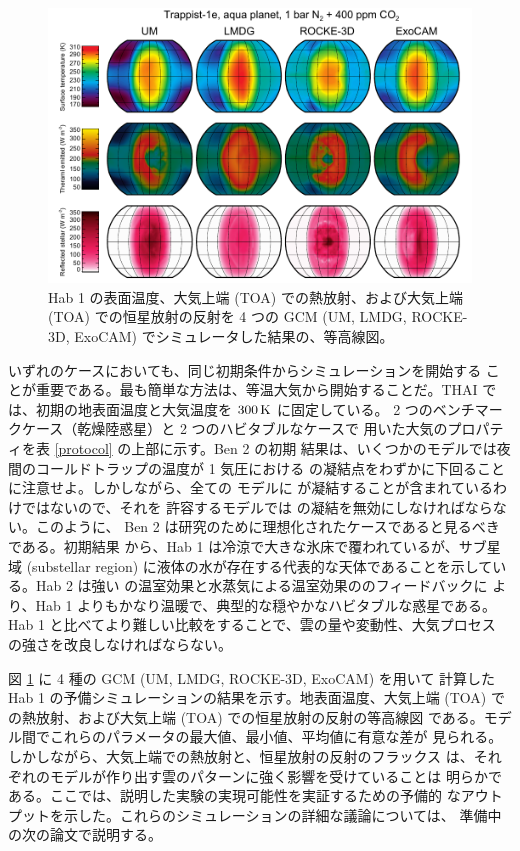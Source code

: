 \documentclass{dennou777}
\begin{document}
\begin{figure}[t]\label{contours}
	\centering
	\includegraphics[width=.8\textwidth]{gmd-13-707-2020-f01-high-res.pdf}
	\caption{
		Hab 1 の表面温度、大気上端 (TOA) での熱放射、および大気上端
		(TOA) での恒星放射の反射を 4 つの GCM (UM, LMDG, ROCKE-3D,
		ExoCAM) でシミュレータした結果の、等高線図。
	}
\end{figure}

いずれのケースにおいても、同じ初期条件からシミュレーションを開始する
ことが重要である。最も簡単な方法は、等温大気から開始することだ。THAI
では、初期の地表面温度と大気温度を \(300\hmu{K}\) に固定している。
2 つのベンチマークケース（乾燥陸惑星）と 2 つのハビタブルなケースで
用いた大気のプロパティを表 \ref{protocol} の上部に示す。Ben 2 の初期
結果は、いくつかのモデルでは夜間のコールドトラップの温度が 1 気圧における
 の凝結点をわずかに下回ることに注意せよ。しかしながら、全ての
モデルに  が凝結することが含まれているわけではないので、それを
許容するモデルでは  の凝結を無効にしなければならない。このように、
Ben 2 は研究のために理想化されたケースであると見るべきである。初期結果
から、Hab 1 は冷涼で大きな氷床で覆われているが、サブ星域 (substellar
region) に液体の水が存在する代表的な天体であることを示している。Hab 2
は強い  の温室効果と水蒸気による温室効果ののフィードバックに
より、Hab 1 よりもかなり温暖で、典型的な穏やかなハビタブルな惑星である。
Hab 1 と比べてより難しい比較をすることで、雲の量や変動性、大気プロセス
の強さを改良しなければならない。

図 \ref{contours} に 4 種の GCM (UM, LMDG, ROCKE-3D, ExoCAM) を用いて
計算した Hab 1 の予備シミュレーションの結果を示す。地表面温度、大気上端
(TOA) での熱放射、および大気上端 (TOA) での恒星放射の反射の等高線図
である。モデル間でこれらのパラメータの最大値、最小値、平均値に有意な差が
見られる。しかしながら、大気上端での熱放射と、恒星放射の反射のフラックス
は、それぞれのモデルが作り出す雲のパターンに強く影響を受けていることは
明らかである。ここでは、説明した実験の実現可能性を実証するための予備的
なアウトプットを示した。これらのシミュレーションの詳細な議論については、
準備中の次の論文で説明する。
\end{document}
